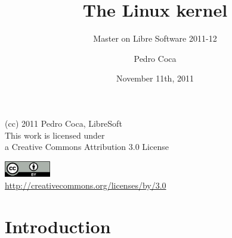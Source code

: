 \documentclass{beamer}
\begin{document}
\title{The Linux kernel}
\subtitle{Master on Libre Software 2011-12}
\author{Pedro Coca} 
\date{November 11th, 2011}


\begin{frame}
  \vspace{2cm}
  \begin{center}
    {\small (cc) 2011 Pedro Coca, LibreSoft} \\
    \medskip
    {\scriptsize This work is licensed under \\ a Creative Commons Attribution 3.0 License}
  \end{center}
  \begin{center}
    \href{http://creativecommons.org/licenses/by/3.0/es}{\includegraphics[width=2cm]{format/cc-by.png}} \\
    {\tiny \url{http://creativecommons.org/licenses/by/3.0}}
  \end{center}
\end{frame}%

\usebackgroundtemplate{}


\section{Introduction}
\end{document}
